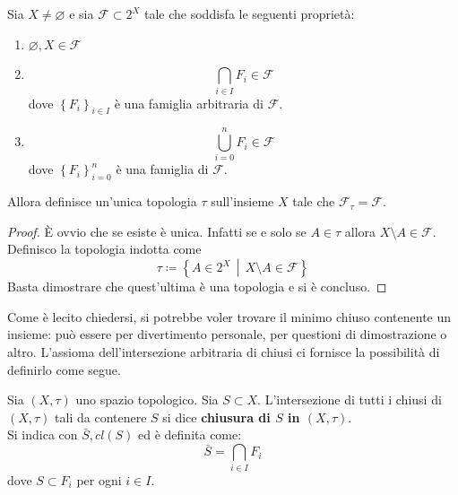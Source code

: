 \begin{lemma}
	Sia $X \neq \varnothing$ e sia $\mathcal{F} \subset 2^X$ tale che soddisfa le seguenti proprietà:
		\begin{enumerate}
		\item $\varnothing, X \in \mathcal{F}$
		\item 
			\begin{equation*}
				\bigcap_{i \in I} F_i \in \mathcal{F}
			\end{equation*}
		dove $\left\{F_i\right\}_{i\in I}$ è una famiglia arbitraria di $\mathcal{F}$.
		\item 
			\begin{equation*}
				\bigcup^{n}_{i = 0} F_i \in \mathcal{F}
			\end{equation*}
		dove $\left\{F_i\right\}^n_{i=0}$ è una famiglia di $\mathcal{F}$.
	\end{enumerate}
	Allora definisce un'unica topologia $\tau$ sull'insieme $X$ tale che $\mathcal{F}_\tau = \mathcal{F}$.
\end{lemma}
\begin{proof}
	È ovvio che se esiste è unica. Infatti se e solo se $A \in \tau$ allora $X \setminus A \in \mathcal{F}$. \\ Definisco la topologia indotta come 
	\begin{equation*}
		\tau \coloneqq \left\{ A \in 2^X \,\middle|\, X \setminus A \in \mathcal{F} \right\}
	\end{equation*}
	Basta dimostrare che quest'ultima è una topologia e si è concluso.
\end{proof}

Come è lecito chiedersi, si potrebbe voler trovare il minimo chiuso contenente un insieme: può essere per divertimento personale, per questioni di dimostrazione o altro. L'assioma dell'intersezione arbitraria di chiusi ci fornisce la possibilità di definirlo come segue.
\begin{definition}
	Sia $(X, \tau)$ uno spazio topologico. Sia $S \subset X$. L'intersezione di tutti i chiusi di $(X,\tau)$ tali da contenere $S$ si dice \textbf{chiusura di $S$ in $(X, \tau)$}. \\ Si indica con $\bar{S}, cl(S)$ ed è definita come:
	\begin{equation*}
		\bar{S} = \bigcap_{i \in I} F_i
	\end{equation*}
	dove $S \subset F_i$ per ogni $i \in I$.
\end{definition}



